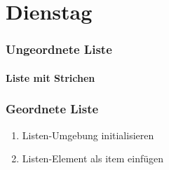 \documentclass{article}
\begin{document}
    \part{Dienstag}
    \section{Ungeordnete Liste}
    \subsection{Liste mit Strichen}
    


    \section{Geordnete Liste}
    \begin{enumerate}
        \item Listen-Umgebung  initialisieren
        \item Listen-Element als item einfügen
    \end{enumerate}
\end{document}

